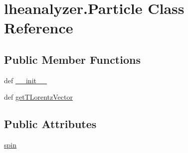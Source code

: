 \section{lheanalyzer.\-Particle Class Reference}
\label{classlheanalyzer_1_1Particle}
\subsection*{Public Member Functions}
\begin{DoxyCompactItemize}
\item 
def \hyperlink{classlheanalyzer_1_1Particle_a800043635ae09b06b66258c82c9aea84}{\-\_\-\-\_\-init\-\_\-\-\_\-}
\item 
def \hyperlink{classlheanalyzer_1_1Particle_a3b23a94b72794bb7ebcb82e037c90e99}{get\-T\-Lorentz\-Vector}
\end{DoxyCompactItemize}
\subsection*{Public Attributes}
\begin{DoxyCompactItemize}
\item 
\hyperlink{classlheanalyzer_1_1Particle_a371705b75ae787f9876d764427858b28}{spin}
\end{DoxyCompactItemize}
